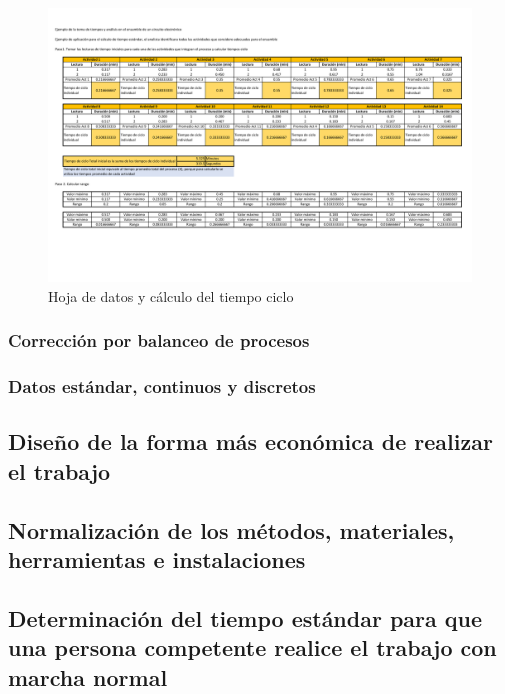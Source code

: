     
    \begin{figure}[H]
        \centering
        \includegraphics[trim = {6.4mm 50mm 6.4mm 19mm},clip,scale=0.3]{22/Img/tiempoCicloEnsamble.pdf}
        \caption{Hoja de datos y cálculo del tiempo ciclo}
        \label{fig:tiempoCiclo}
    \end{figure}
    
    
    
    
    \subsubsection{Corrección por balanceo de procesos}
    \subsubsection{Datos estándar, continuos y discretos}
    \subsection{Diseño de la forma más económica de realizar el trabajo}
    
    \subsection{Normalización de los métodos, materiales, herramientas e instalaciones}
    
    \subsection{Determinación del tiempo estándar para que una persona competente realice el trabajo con marcha normal}
    
